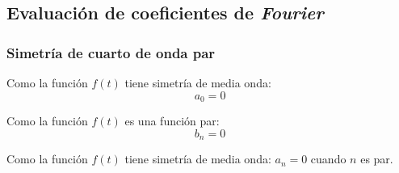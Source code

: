 \subsection{Evaluación de coeficientes de \emph{Fourier}}
\subsubsection{Simetría de cuarto de onda par}
Como la función $f(t)$ tiene simetría de media onda:
\begin{equation}
    a_0=0
\end{equation}

Como la función $f(t)$ es una función par:
\begin{equation}
    b_n=0
\end{equation}

Como la función $f(t)$ tiene simetría de media onda: $a_n=0$ cuando $n$ es par.


